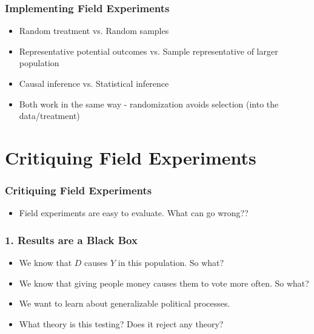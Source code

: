 \documentclass[xcolor=x11names,compress]{beamer}\usepackage[]{graphicx}\usepackage[]{color}
\renewcommand{\(}{\begin{columns}}
\renewcommand{\)}{\end{columns}}
\newcommand{\<}[1]{\begin{column}{#1}}
\renewcommand{\>}{\end{column}}
\begin{document}
\begin{frame}
\frametitle{Implementing Field Experiments}
\begin{itemize}
\item Random treatment vs. Random samples
\pause
\item Representative potential outcomes vs. Sample representative of larger population
\pause
\item Causal inference vs. Statistical inference
\pause
\item Both work in the same way - randomization avoids selection (into the data/treatment)
\end{itemize}
\end{frame}

\section{Critiquing Field Experiments}

\begin{frame}
\frametitle{Critiquing Field Experiments}
\begin{itemize}
\item Field experiments are easy to evaluate. What can go wrong??
\end{itemize}
\end{frame}

\begin{frame}
\frametitle{1. Results are a Black Box}
\begin{itemize}
\item We know that $D$ causes $Y$ in this population. So what?
\pause
\item We know that giving people money causes them to vote more often. So what?
\pause
\item We want to learn about generalizable political processes.
\pause
\item What theory is this testing? \pause Does it reject any theory?
\end{itemize}
\end{frame}
\end{document}

